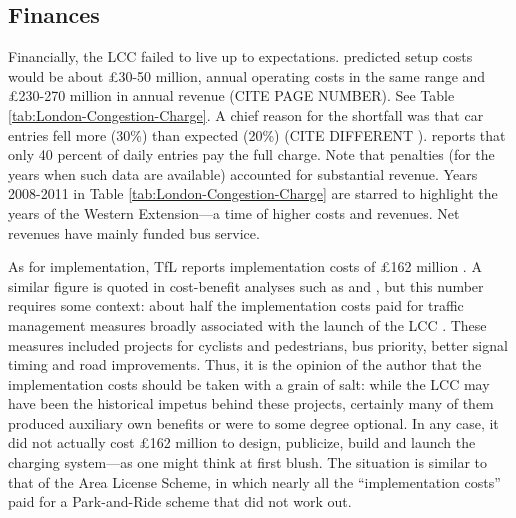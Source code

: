 



\subsection{Finances}

Financially, the LCC failed to live up to expectations. \citet{ROCOL2000} predicted setup costs would be about \pounds30-50 million, annual operating costs in the same range and \pounds230-270 million in annual revenue (CITE PAGE NUMBER). See Table \ref{tab:London-Congestion-Charge}. A chief reason for the shortfall was that car entries fell more (30\%) than expected (20\%) (CITE DIFFERENT \citep[p.169]{Leape2006}). \citet{TfLExPost2007} reports that only 40 percent of daily entries pay the full charge. Note that penalties (for the years when such data are available) accounted for substantial revenue. Years 2008-2011 in Table \ref{tab:London-Congestion-Charge} are starred to highlight the years of the Western Extension---a time of higher costs and revenues. Net revenues have mainly funded bus service.
 


As for implementation, TfL reports implementation costs of \pounds162 million \citep[p. 135]{TfLFifth2007}. A similar figure is quoted in cost-benefit analyses such as \citet{Leape2006} and \citet{Prudhomme2005}, but this number requires some context: about half the implementation costs paid for traffic management measures broadly associated with the launch of the LCC \citep[pp. 132-133,138]{Richards2006}. These measures included projects for cyclists and pedestrians, bus priority, better signal timing and road improvements. Thus, it is the opinion of the author that the implementation costs should be taken with a grain of salt: while the LCC may have been the historical impetus behind these projects, certainly many of them produced auxiliary own benefits or were to some degree optional. In any case, it did not actually cost \pounds 162 million to design, publicize, build and launch the charging system---as one might think at first blush. The situation is similar to that of the Area License Scheme, in which nearly all the ``implementation costs'' paid for a Park-and-Ride scheme that did not work out.

